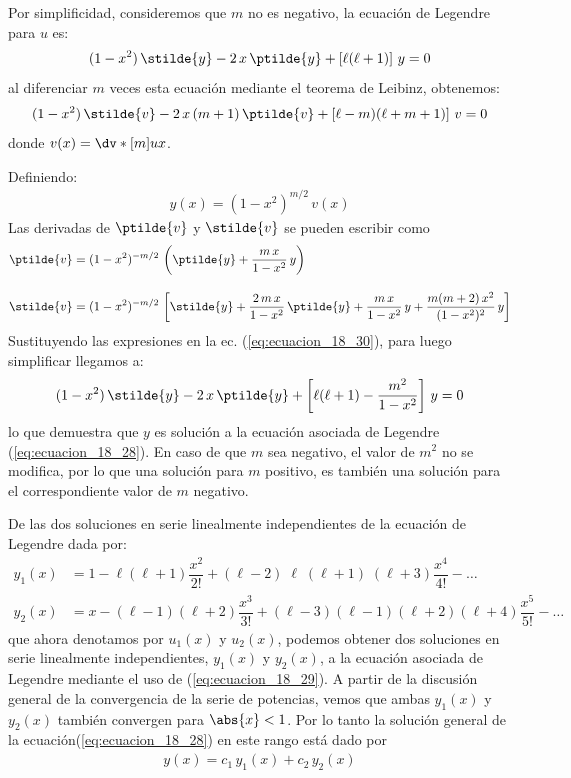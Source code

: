 \par
Por simplificidad, consideremos que $m$ no es negativo, la ecuación de Legendre para $u$ es:
\begin{align*}
(1 - x^{2}) \, \stilde{y} - 2 \, x \, \ptilde{y} + \left[ \ell (\ell + 1) \right] \, y = 0
\end{align*}
al diferenciar $m$ veces esta ecuación mediante el teorema de Leibinz, obtenemos:
\begin{align}
(1 - x^{2}) \, \stilde{v} - 2 \, x \, (m + 1) \, \ptilde{v} + \left[ \ell - m) (\ell + m + 1) \right] \, v = 0
\label{eq:ecuacion_18_30}
\end{align}
donde $v(x) = \dv*[m]{u}{x}$.
\par
Definiendo:
\begin{align*}
y(x) = (1 - x^{2}) ^{m/2} \, v(x)
\end{align*}
Las derivadas de $\ptilde{v}$ y $\stilde{v}$ se pueden escribir como
\begin{align*}
\ptilde{v} &= (1 - x^{2})^{-m/2} \, \left( \ptilde{y} + \dfrac{m \, x}{1 -x^{2}} \, y \right) \\[1em]
\stilde{v} &= (1 - x^{2})^{-m/2} \, \left[ \stilde{y} + \dfrac{2 \, m \, x}{1 -x^{2}} \, \ptilde{y} + \dfrac{m \, x}{1 -x^{2}} \, y + \dfrac{m(m + 2) \, x^{2}}{(1 -x^{2})^{2}} \, y \right]
\end{align*}
Sustituyendo las expresiones en la ec. (\ref{eq:ecuacion_18_30}), para luego simplificar llegamos a:
\begin{align*}
(1 - x^{2}) \, \stilde{y} - 2 \, x \, \ptilde{y} + \left[ \ell (\ell + 1) - \dfrac{m^{2}}{1 - x^{2}} \right] \, y = 0
\end{align*}
lo que demuestra que $y$ es solución a la ecuación asociada de Legendre (\ref{eq:ecuacion_18_28}). En caso de que $m$ sea negativo, el valor de $m^{2}$ no se modifica, por lo que una solución para $m$ positivo, es también una solución para el correspondiente valor de $m$ negativo.
\par
De las dos soluciones en serie linealmente independientes de la ecuación de Legendre dada por:
\begin{align*}
y_{1}(x) &= 1 - \ell (\ell + 1) \dfrac{x^{2}}{2!} + (\ell - 2)\; \ell \; (\ell + 1)\;(\ell + 3) \dfrac{x^{4}}{4!} - \ldots \\[1em]
y_{2}(x) &= x - (\ell - 1)(\ell + 2) \dfrac{x^{3}}{3!} + (\ell - 3) (\ell - 1)(\ell + 2)(\ell + 4) \dfrac{x^{5}}{5!} - \ldots
\end{align*}
que ahora denotamos por $u_{1} (x)$ y $u_{2}(x)$, podemos obtener dos soluciones en serie linealmente independientes, $y_{1} (x)$ y $y_{2} (x)$, a la ecuación asociada de Legendre mediante el uso de (\ref{eq:ecuacion_18_29}). A partir de la discusión general de la convergencia de la serie de potencias, vemos que ambas $y_{1} (x)$ y $y_{2} (x)$ también convergen para $\abs{x} < 1$. Por lo tanto la solución general de la ecuación(\ref{eq:ecuacion_18_28}) en este rango está dado por
\begin{align*}
y(x) = c_{1} \, y_{1} (x) + c_{2} \, y_{2} (x)
\end{align*}
